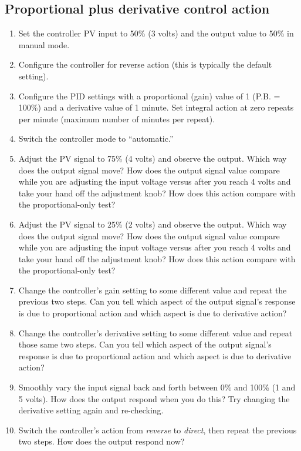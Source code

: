 \filbreak
\subsection{Proportional plus derivative control action}

\begin{enumerate}
\item Set the controller PV input to 50\% (3 volts) and the output value to 50\% in manual mode.
\item Configure the controller for reverse action (this is typically the default setting).
\item Configure the PID settings with a proportional (gain) value of 1 (P.B. = 100\%) and a derivative value of 1 minute.  Set integral action at zero repeats per minute (maximum number of minutes per repeat).
\item Switch the controller mode to ``automatic.''
\item Adjust the PV signal to 75\% (4 volts) and observe the output.  Which way does the output signal move?  How does the output signal value compare while you are adjusting the input voltage versus after you reach 4 volts and take your hand off the adjustment knob?  How does this action compare with the proportional-only test?
\item Adjust the PV signal to 25\% (2 volts) and observe the output.  Which way does the output signal move?  How does the output signal value compare while you are adjusting the input voltage versus after you reach 4 volts and take your hand off the adjustment knob?  How does this action compare with the proportional-only test?
\item Change the controller's gain setting to some different value and repeat the previous two steps.  Can you tell which aspect of the output signal's response is due to proportional action and which aspect is due to derivative action?
\item Change the controller's derivative setting to some different value and repeat those same two steps.  Can you tell which aspect of the output signal's response is due to proportional action and which aspect is due to derivative action?
\item Smoothly vary the input signal back and forth between 0\% and 100\% (1 and 5 volts).  How does the output respond when you do this?  Try changing the derivative setting again and re-checking.
\item Switch the controller's action from \textit{reverse} to \textit{direct}, then repeat the previous two steps.  How does the output respond now?
\end{enumerate}







